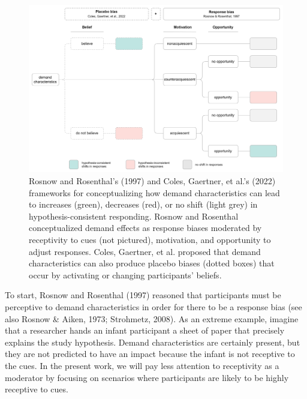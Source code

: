 \documentclass[
  man,floatsintext]{apa6}
\begin{document}
\begin{figure}
\includegraphics[width=11.35in]{images/metaware_framework} \caption{Rosnow and Rosenthal’s (1997) and Coles, Gaertner, et al.’s (2022) frameworks for conceptualizing how demand characteristics can lead to increases (green), decreases (red), or no shift (light grey) in hypothesis-consistent responding. Rosnow and Rosenthal conceptualized demand effects as response biases moderated by receptivity to cues (not pictured), motivation, and opportunity to adjust responses. Coles, Gaertner, et al. proposed that demand characteristics can also produce placebo biases (dotted boxes) that occur by activating or changing participants’ beliefs.}\label{fig:framework}
\end{figure}

To start, Rosnow and Rosenthal (1997) reasoned that participants must be perceptive to demand characteristics in order for there to be a response bias (see also Rosnow \& Aiken, 1973; Strohmetz, 2008). As an extreme example, imagine that a researcher hands an infant participant a sheet of paper that precisely explains the study hypothesis. Demand characteristics are certainly present, but they are not predicted to have an impact because the infant is not receptive to the cues. In the present work, we will pay less attention to receptivity as a moderator by focusing on scenarios where participants are likely to be highly receptive to cues.
\end{document}
